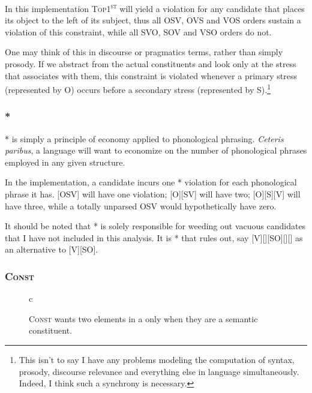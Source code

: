 \documentclass{article}
\newcommand{\cons}{\textsc{Const}}
\newcommand{\topf}{\textsc{Top1\textsuperscript{st}}}
\newcommand{\nophi}{\textsc{*\textphi}}
\begin{document}
In this implementation {\topf} will yield a violation for any candidate that places its object to the left of its subject, thus all OSV, OVS and VOS orders sustain a violation of this constraint, while all SVO, SOV and VSO orders do not.

One may think of this in discourse or pragmatics terms, rather than simply prosody.
If we abstract from the actual constituents and look only at the stress that associates with them, this constraint is violated whenever a primary stress (represented by O) occurs before a secondary stress (represented by S).\footnote{This isn't to say I have any problems modeling the computation of syntax, prosody, discourse relevance and everything else in language simultaneously. Indeed, I think such a synchrony is necessary.}

\subsubsection{\nophi}

{\nophi} is simply a principle of economy applied to phonological phrasing.
\textit{Ceteris paribus}, a language will want to economize on the number of phonological phrases employed in any given structure.

In the implementation, a candidate incurs one {\nophi} violation for each phonological phrase it has.
[OSV] will have one violation; [O][SV] will have two; [O][S][V] will have three, while a totally unparsed OSV would hypothetically have zero.

It should be noted that {\nophi} is solely responsible for weeding out vacuous candidates that I have not included in this analysis.
It is {\nophi} that rules out, say [V][][SO][][] as an alternative to [V][SO].

\subsubsection{\cons}

\begin{figure}
\begin{center}
\begin{tableau}{c}
		\const{\cons}
	\cand{[SO][V]} \vio{*!}
	\cand[\Optimal]{[S][VO]} \vio{}
\end{tableau}
\end{center}
	\caption{{\cons} wants two elements in a {\textphi} only when they are a semantic constituent.}
\end{figure}
\end{document}
